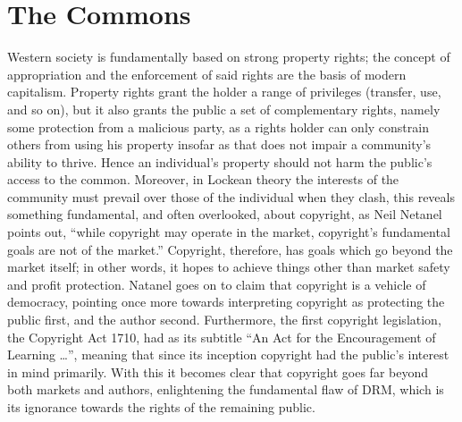 \documentclass[12pt,letterpaper]{article}
\begin{document}
\section{The Commons}
Western society is fundamentally based on strong property rights; the concept of appropriation and the enforcement of said rights are the basis of modern capitalism. Property rights grant the holder a range of privileges (transfer, use, and so on), but it also grants the public a set of complementary rights, namely some protection from a malicious party, as a rights holder can only constrain others from using his property insofar as that does not impair a community's ability to
thrive\autocite[\ppno~1555--1560]{gordon-1993}. Hence an individual's property should not harm the public's access to the common. Moreover, in Lockean theory the interests of the community must prevail over those of the individual when they clash\autocite[\pno~120]{favale-2014}, this reveals something fundamental, and often overlooked, about copyright, as Neil Netanel points out, ``while copyright may operate in the market, copyright's fundamental goals are not of the market.''\autocite[\pno~341]{netanel-2001} Copyright, therefore, has goals which go beyond the market itself; in other words, it hopes to achieve things other than market safety and profit protection. Natanel goes on to claim that copyright is a vehicle of democracy, pointing once more towards interpreting copyright as protecting the public first, and the author second. Furthermore, the first copyright legislation, the Copyright Act 1710, had as its subtitle ``An Act for the Encouragement of Learning \ldots''\autocite{wortley-1710}, meaning that since its inception copyright had the public's interest in mind primarily. With this it becomes clear that copyright goes far beyond both markets and authors, enlightening the fundamental flaw of DRM, which is its ignorance towards the rights of the remaining public.
\end{document}
